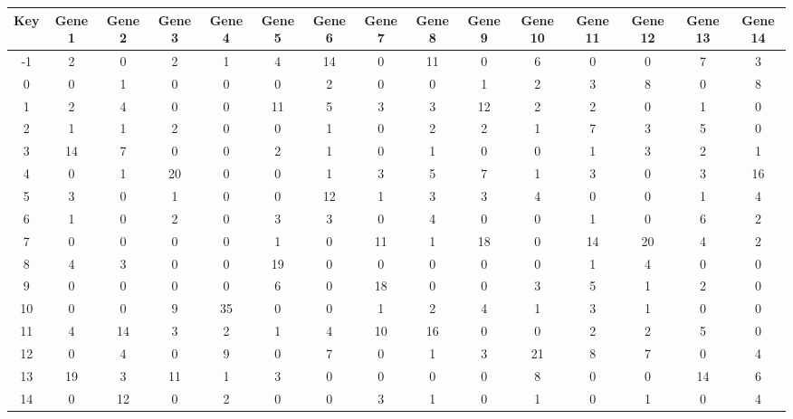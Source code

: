 \begin{tabular}{|c|c|c|c|c|c|c|c|c|c|c|c|c|c|c|}
\hline
Key & Gene 1 & Gene 2 & Gene 3 & Gene 4 & Gene 5 & Gene 6 & Gene 7 & Gene 8 & Gene 9 & Gene 10 & Gene 11 & Gene 12 & Gene 13 & Gene 14 \\
\hline
-1 & 2 & 0 & 2 & 1 & 4 & 14 & 0 & 11 & 0 & 6 & 0 & 0 & 7 & 3 \\
0 & 0 & 1 & 0 & 0 & 0 & 2 & 0 & 0 & 1 & 2 & 3 & 8 & 0 & 8 \\
1 & 2 & 4 & 0 & 0 & 11 & 5 & 3 & 3 & 12 & 2 & 2 & 0 & 1 & 0 \\
2 & 1 & 1 & 2 & 0 & 0 & 1 & 0 & 2 & 2 & 1 & 7 & 3 & 5 & 0 \\
3 & 14 & 7 & 0 & 0 & 2 & 1 & 0 & 1 & 0 & 0 & 1 & 3 & 2 & 1 \\
4 & 0 & 1 & 20 & 0 & 0 & 1 & 3 & 5 & 7 & 1 & 3 & 0 & 3 & 16 \\
5 & 3 & 0 & 1 & 0 & 0 & 12 & 1 & 3 & 3 & 4 & 0 & 0 & 1 & 4 \\
6 & 1 & 0 & 2 & 0 & 3 & 3 & 0 & 4 & 0 & 0 & 1 & 0 & 6 & 2 \\
7 & 0 & 0 & 0 & 0 & 1 & 0 & 11 & 1 & 18 & 0 & 14 & 20 & 4 & 2 \\
8 & 4 & 3 & 0 & 0 & 19 & 0 & 0 & 0 & 0 & 0 & 1 & 4 & 0 & 0 \\
9 & 0 & 0 & 0 & 0 & 6 & 0 & 18 & 0 & 0 & 3 & 5 & 1 & 2 & 0 \\
10 & 0 & 0 & 9 & 35 & 0 & 0 & 1 & 2 & 4 & 1 & 3 & 1 & 0 & 0 \\
11 & 4 & 14 & 3 & 2 & 1 & 4 & 10 & 16 & 0 & 0 & 2 & 2 & 5 & 0 \\
12 & 0 & 4 & 0 & 9 & 0 & 7 & 0 & 1 & 3 & 21 & 8 & 7 & 0 & 4 \\
13 & 19 & 3 & 11 & 1 & 3 & 0 & 0 & 0 & 0 & 8 & 0 & 0 & 14 & 6 \\
14 & 0 & 12 & 0 & 2 & 0 & 0 & 3 & 1 & 0 & 1 & 0 & 1 & 0 & 4 \\
\hline
\end{tabular}